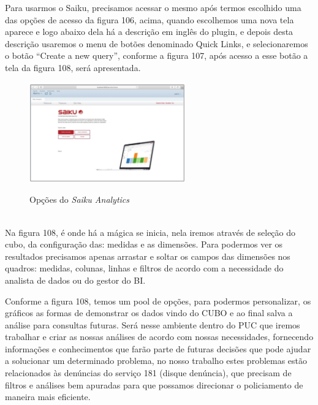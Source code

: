 Para usarmos o Saiku, precisamos acessar o mesmo ap\'{o}s termos escolhido uma das op\c{c}\~{o}es de acesso da figura 106, acima, 
quando escolhemos uma nova tela aparece e logo abaixo dela h\'{a} a descri\c{c}\~{a}o em inglês do plugin, e depois desta descri\c{c}\~{a}o
 usaremos o menu de bot\~{o}es denominado Quick Links, e selecionaremos o bot\~{a}o ``Create a new query'', conforme a figura 107,  ap\'{o}s 
 acesso a esse bot\~{a}o a tela da figura 108, ser\'{a} apresentada.

\begin{figure}[H]
	\vspace*{0,2cm}
    \centering
    \caption{Op\c{c}\~{o}es do \textit{Saiku Analytics}}
    \includegraphics[width=0.6\textwidth]{./04-figuras/figura-puc-saiku-opcoes}
    \label{fig:ilustfigpucsaikuopcoes}
\end{figure}
\vspace*{-0,9cm}
{\raggedright {}} \\

Na figura 108, \'{e} onde h\'{a} a m\'{a}gica se inicia, nela iremos atrav\'{e}s de sele\c{c}\~{a}o do cubo, da configura\c{c}\~{a}o das: medidas e as dimens\~{o}es. 
Para podermos ver os resultados precisamos apenas arrastar e soltar os campos das dimens\~{o}es nos quadros: medidas, colunas, linhas e filtros de acordo com a necessidade 
do analista de dados ou do gestor do BI.

Conforme a figura 108, temos um pool de op\c{c}\~{o}es, para podermos personalizar, os gr\'{a}ficos as formas de demonstrar os dados vindo do CUBO e ao final 
salva a an\'{a}lise para consultas futuras.   
Ser\'{a} nesse ambiente dentro do PUC que iremos trabalhar e criar as nossas an\'{a}lises de acordo com nossas necessidades, fornecendo informa\c{c}\~{o}es e 
conhecimentos que far\~{a}o parte de futuras decis\~{o}es que pode ajudar a solucionar um determinado problema, no nosso trabalho estes problemas est\~{a}o 
relacionados às denúncias do servi\c{c}o 181 (disque denúncia), que precisam de filtros e an\'{a}lises bem apuradas para que possamos direcionar o policiamento de maneira mais eficiente.

